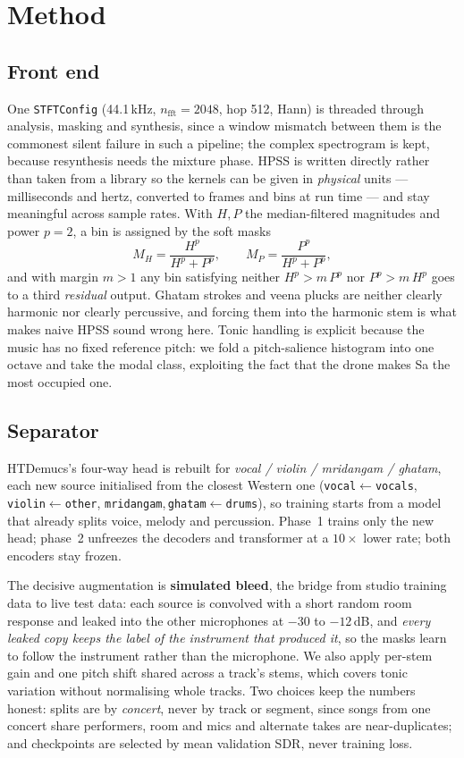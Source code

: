 \documentclass[11pt,a4paper,twocolumn]{article}
\begin{document}
\section{Method}
\subsection{Front end}
One \texttt{STFTConfig} (44.1\,kHz, $n_\text{fft}{=}2048$, hop 512, Hann) is threaded through
analysis, masking and synthesis, since a window mismatch between them is the commonest silent
failure in such a pipeline; the complex spectrogram is kept, because resynthesis needs the
mixture phase. HPSS is written directly rather than taken from a library so the kernels can be
given in \emph{physical} units --- milliseconds and hertz, converted to frames and bins at run
time --- and stay meaningful across sample rates. With $H,P$ the median-filtered magnitudes and
power $p{=}2$, a bin is assigned by the soft masks
\begin{equation}
M_H=\frac{H^{p}}{H^{p}+P^{p}},\qquad M_P=\frac{P^{p}}{H^{p}+P^{p}},
\end{equation}
and with margin $m>1$ any bin satisfying neither $H^{p}>m\,P^{p}$ nor $P^{p}>m\,H^{p}$ goes to a
third \emph{residual} output. Ghatam strokes and veena plucks are neither clearly harmonic nor
clearly percussive, and forcing them into the harmonic stem is what makes naive HPSS sound wrong
here. Tonic handling is explicit because the music has no fixed reference pitch: we fold a
pitch-salience histogram into one octave and take the modal class, exploiting the fact that the
drone makes Sa the most occupied one.

\subsection{Separator}
HTDemucs's four-way head is rebuilt for \emph{vocal / violin / mridangam / ghatam}, each new
source initialised from the closest Western one (\texttt{vocal}$\leftarrow$\texttt{vocals},
\texttt{violin}$\leftarrow$\texttt{other},
\texttt{mridangam},\,\texttt{ghatam}$\leftarrow$\texttt{drums}), so training starts from a model
that already splits voice, melody and percussion. Phase~1 trains only the new head; phase~2
unfreezes the decoders and transformer at a $10\times$ lower rate; both encoders stay frozen.

The decisive augmentation is \textbf{simulated bleed}, the bridge from studio training data to
live test data: each source is convolved with a short random room response and leaked into the
other microphones at $-30$ to $-12$\,dB, and \emph{every leaked copy keeps the label of the
instrument that produced it}, so the masks learn to follow the instrument rather than the
microphone. We also apply per-stem gain and one pitch shift shared across a track's stems, which
covers tonic variation without normalising whole tracks. Two choices keep the numbers honest:
splits are by \emph{concert}, never by track or segment, since songs from one concert share
performers, room and mics and alternate takes are near-duplicates; and checkpoints are selected
by mean validation SDR, never training loss.
\end{document}
